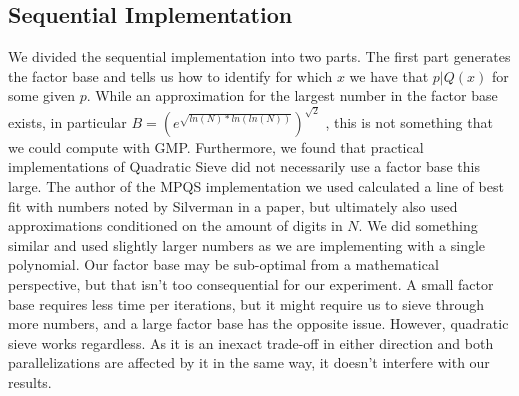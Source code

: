 \documentclass[11pt,twocolumn]{article}
\begin{document}
\subsection{Sequential Implementation}
\indent We divided the sequential implementation into two parts. The first part generates the factor base and tells us how to identify for which $x$ we have that $p|Q(x)$ for some given $p$. While an approximation for the largest number in the factor base exists, in particular $B = (e^{\sqrt{ln(N)*ln(ln(N))}})^{\sqrt{2}}$ \cite{asbrink:parallelqs}, this is not something that we could compute with GMP. Furthermore, we found that practical implementations of Quadratic Sieve did not necessarily use a factor base this large. The author of the MPQS implementation we used \cite{bytopia:help} calculated a line of best fit with numbers noted by Silverman in a paper, but ultimately also used approximations conditioned on the amount of digits in $N$. We did something similar and used slightly larger numbers as we are implementing with a single polynomial. Our factor base may be sub-optimal from a mathematical perspective, but that isn't too consequential for our experiment. A small factor base requires less time per iterations, but it might require us to sieve through more numbers, and a large factor base has the opposite issue. However, quadratic sieve works regardless. As it is an inexact trade-off in either direction and both parallelizations are affected by it in the same way, it doesn't interfere with our results.
\end{document}
